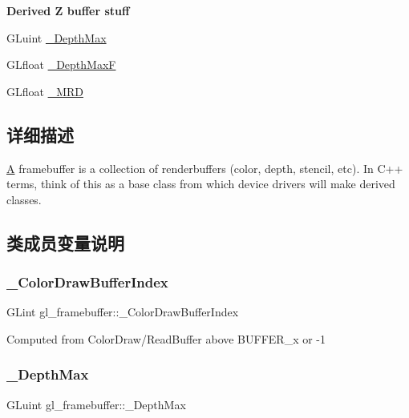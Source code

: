 \begin{Indent}\textbf{ Derived Z buffer stuff}\par
\begin{DoxyCompactItemize}
\item 
G\+Luint \hyperlink{structgl__framebuffer_a5b99c71bac994f7d532b210176507d8f}{\+\_\+\+Depth\+Max}
\item 
G\+Lfloat \hyperlink{structgl__framebuffer_aa8142b01ba5c1fdaba570d71eac7cb89}{\+\_\+\+Depth\+MaxF}
\item 
G\+Lfloat \hyperlink{structgl__framebuffer_afbbe2efe5298a3f3d5e497860d29c721}{\+\_\+\+M\+RD}
\end{DoxyCompactItemize}
\end{Indent}


\subsection{详细描述}
\hyperlink{struct_a}{A} framebuffer is a collection of renderbuffers (color, depth, stencil, etc). In C++ terms, think of this as a base class from which device drivers will make derived classes. 

\subsection{类成员变量说明}
\mbox{\label{structgl__framebuffer_ac33c52ba1acfaf662daaea2e38083321}} 
\subsubsection{\texorpdfstring{\+\_\+\+Color\+Draw\+Buffer\+Index}{\_ColorDrawBufferIndex}}
{\footnotesize\ttfamily G\+Lint gl\+\_\+framebuffer\+::\+\_\+\+Color\+Draw\+Buffer\+Index}

Computed from Color\+Draw/\+Read\+Buffer above B\+U\+F\+F\+E\+R\+\_\+x or -\/1 \mbox{\label{structgl__framebuffer_a5b99c71bac994f7d532b210176507d8f}} 
\subsubsection{\texorpdfstring{\+\_\+\+Depth\+Max}{\_DepthMax}}
{\footnotesize\ttfamily G\+Luint gl\+\_\+framebuffer\+::\+\_\+\+Depth\+Max}

